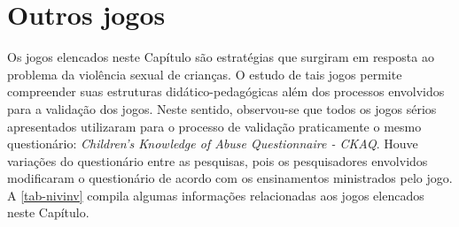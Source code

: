 









\newpage

\section{Outros jogos}\label{sssec:outros}

Os jogos elencados neste Capítulo são estratégias que surgiram em resposta ao problema da violência sexual de crianças. O estudo de tais jogos permite compreender suas estruturas didático-pedagógicas além dos processos envolvidos para a validação dos jogos. Neste sentido, observou-se que todos os jogos sérios apresentados utilizaram para o processo de validação praticamente o mesmo questionário: \textit{Children’s Knowledge of Abuse Questionnaire - CKAQ}. Houve variações do questionário entre as pesquisas, pois os pesquisadores envolvidos modificaram o questionário de acordo com os ensinamentos ministrados pelo jogo. A \autoref{tab-nivinv} compila algumas informações relacionadas aos jogos elencados neste Capítulo. 



